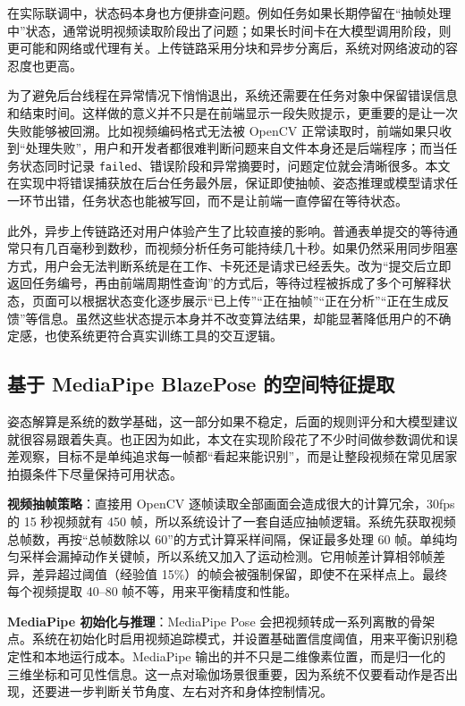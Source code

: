 \documentclass[UTF8,twoside]{ctexrep}
\makeatletter
\def@NAT@last@yr{\@citea}%
\def@NAT@last@yr{-\NAT@penalty}%
\makeatother
\begin{document}
在实际联调中，状态码本身也方便排查问题。例如任务如果长期停留在“抽帧处理中”状态，通常说明视频读取阶段出了问题；如果长时间卡在大模型调用阶段，则更可能和网络或代理有关。上传链路采用分块和异步分离后，系统对网络波动的容忍度也更高。

为了避免后台线程在异常情况下悄悄退出，系统还需要在任务对象中保留错误信息和结束时间。这样做的意义并不只是在前端显示一段失败提示，更重要的是让一次失败能够被回溯。比如视频编码格式无法被 OpenCV 正常读取时，前端如果只收到“处理失败”，用户和开发者都很难判断问题来自文件本身还是后端程序；而当任务状态同时记录 \texttt{failed}、错误阶段和异常摘要时，问题定位就会清晰很多。本文在实现中将错误捕获放在后台任务最外层，保证即使抽帧、姿态推理或模型请求任一环节出错，任务状态也能被写回，而不是让前端一直停留在等待状态。

此外，异步上传链路还对用户体验产生了比较直接的影响。普通表单提交的等待通常只有几百毫秒到数秒，而视频分析任务可能持续几十秒。如果仍然采用同步阻塞方式，用户会无法判断系统是在工作、卡死还是请求已经丢失。改为“提交后立即返回任务编号，再由前端周期性查询”的方式后，等待过程被拆成了多个可解释状态，页面可以根据状态变化逐步展示“已上传”“正在抽帧”“正在分析”“正在生成反馈”等信息。虽然这些状态提示本身并不改变算法结果，却能显著降低用户的不确定感，也使系统更符合真实训练工具的交互逻辑。

\subsection{基于 MediaPipe BlazePose 的空间特征提取}
姿态解算是系统的数学基础，这一部分如果不稳定，后面的规则评分和大模型建议就很容易跟着失真。也正因为如此，本文在实现阶段花了不少时间做参数调优和误差观察，目标不是单纯追求每一帧都“看起来能识别”，而是让整段视频在常见居家拍摄条件下尽量保持可用状态。

\textbf{视频抽帧策略}：直接用 OpenCV 逐帧读取全部画面会造成很大的计算冗余，30fps 的 15 秒视频就有 450 帧，所以系统设计了一套自适应抽帧逻辑。系统先获取视频总帧数，再按“总帧数除以 60”的方式计算采样间隔，保证最多处理 60 帧。单纯均匀采样会漏掉动作关键帧，所以系统又加入了运动检测。它用帧差计算相邻帧差异，差异超过阈值（经验值 15\%）的帧会被强制保留，即使不在采样点上。最终每个视频提取 40--80 帧不等，用来平衡精度和性能。

\textbf{MediaPipe 初始化与推理}：MediaPipe Pose 会把视频转成一系列离散的骨架点。系统在初始化时启用视频追踪模式，并设置基础置信度阈值，用来平衡识别稳定性和本地运行成本。MediaPipe 输出的并不只是二维像素位置，而是归一化的三维坐标和可见性信息。这一点对瑜伽场景很重要，因为系统不仅要看动作是否出现，还要进一步判断关节角度、左右对齐和身体控制情况。
\end{document}
